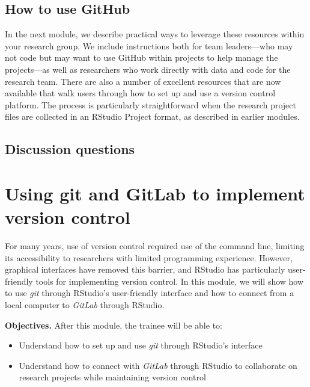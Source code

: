 \documentclass[]{tufte-book}
\providecommand{\tightlist}{%
  \setlength{\itemsep}{0pt}\setlength{\parskip}{0pt}}
\begin{document}
\hypertarget{how-to-use-github}{%
\subsection{How to use GitHub}\label{how-to-use-github}}

In the next module, we describe practical ways to leverage these resources
within your research group. We include instructions both for team leaders---who
may not code but may want to use GitHub within projects to help manage the
projects---as well as researchers who work directly with data and code for the
research team. There are also a number of excellent resources that are now
available that walk users through how to set up and use a version control
platform. The process is particularly straightforward when the research project
files are collected in an RStudio Project format, as described in earlier
modules.

\hypertarget{discussion-questions-4}{%
\subsection{Discussion questions}\label{discussion-questions-4}}

\hypertarget{using-git-and-gitlab-to-implement-version-control}{%
\section{Using git and GitLab to implement version control}\label{using-git-and-gitlab-to-implement-version-control}}

For many years, use of version control required use of the command line,
limiting its accessibility to researchers with limited programming experience.
However, graphical interfaces have removed this barrier, and RStudio has
particularly user-friendly tools for implementing version control. In this
module, we will show how to use \emph{git} through RStudio's user-friendly
interface and how to connect from a local computer to \emph{GitLab} through
RStudio.

\textbf{Objectives.} After this module, the trainee will be able to:

\begin{itemize}
\tightlist
\item
  Understand how to set up and use \emph{git} through RStudio's interface
\item
  Understand how to connect with \emph{GitLab} through RStudio to collaborate on\\
  research projects while maintaining version control
\end{itemize}
\end{document}
